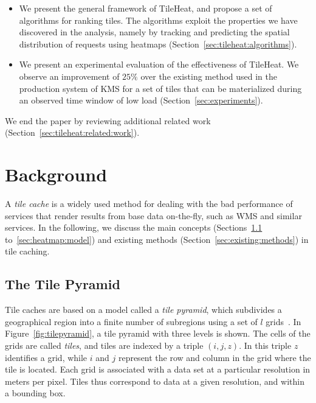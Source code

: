 \documentclass[11pt, oneside]{report}
\begin{document}
{\begin{itemize}
\item We present the general framework of TileHeat, and propose a set of algorithms for ranking tiles. The algorithms exploit the properties we have discovered in the analysis, namely by tracking and predicting the spatial distribution of requests using heatmaps (Section~\ref{sec:tileheat:algorithms}).

\item We present an experimental evaluation of the effectiveness of TileHeat. We observe an improvement of $25\%$ over the existing method used in the production system of KMS  for a set of tiles that can be materialized during an observed time window of low load (Section~\ref{sec:experiments}).

\end{itemize}
%
We end the paper by reviewing additional related work (Section~\ref{sec:tileheat:related:work}). 


\section{Background}
\label{sec:tile:caching}

A \emph{tile cache} is a widely used method for dealing with the bad performance of services that render results from base data on-the-fly, such as WMS and similar services. In the following, we discuss the main concepts (Sections~\ref{sec:tile:pyramid} to~\ref{sec:heatmap:model}) and existing methods (Section~\ref{sec:existing:methods}) in tile caching.

\subsection{The Tile Pyramid}
\label{sec:tile:pyramid}

Tile caches are based on a model called a \emph{tile pyramid}, which subdivides a geographical region into a finite number of subregions using a set of $l$ grids~\cite{decola93}. In Figure~\ref{fig:tilepyramid}, a tile pyramid with three levels is shown. The cells of the grids are called \emph{tiles}, and tiles are indexed by a triple $(i,j,z)$. In this triple $z$ identifies a grid, while $i$ and $j$ represent the row and column in the grid where the tile is located. Each grid is associated with a data set at a particular resolution in meters per pixel. Tiles thus correspond to data at a given resolution, and within a bounding box.

}
\end{document}
